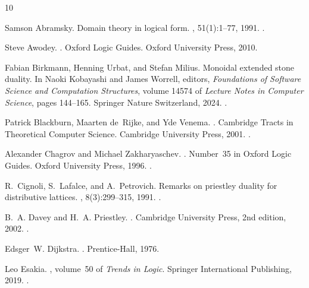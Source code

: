 \documentclass[10pt,a4paper]{article}
\begin{document}
\begin{thebibliography}{10}

Samson Abramsky.
\newblock Domain theory in logical form.
, 51(1):1--77, 1991.
\newblock \href {https://doi.org/10.1016/0168-0072(91)90065-T}
  {}.

Steve Awodey.
.
\newblock Oxford Logic Guides. Oxford University Press, 2010.

Fabian Birkmann, Henning Urbat, and Stefan Milius.
\newblock Monoidal extended stone duality.
\newblock In Naoki Kobayashi and James Worrell, editors, {\em Foundations of
  Software Science and Computation Structures}, volume 14574 of {\em Lecture
  Notes in Computer Science}, pages 144--165. Springer Nature Switzerland,
  2024.
\newblock \href {https://doi.org/10.1007/978-3-031-57228-9_8}
  {}.

Patrick Blackburn, Maarten de~Rijke, and Yde Venema.
.
\newblock Cambridge Tracts in Theoretical Computer Science. Cambridge
  University Press, 2001.
\newblock \href {https://doi.org/10.1017/CBO9781107050884}
  {}.

Alexander Chagrov and Michael Zakharyaschev.
.
\newblock Number~35 in Oxford Logic Guides. Oxford University Press, 1996.
\newblock \href {https://doi.org/10.1093/oso/9780198537793.001.0001}
  {}.

R.~Cignoli, S.~Lafalce, and A.~Petrovich.
\newblock Remarks on priestley duality for distributive lattices.
, 8(3):299--315, 1991.
\newblock \href {https://doi.org/10.1007/BF00383451}
  {}.

B.~A. Davey and H.~A. Priestley.
.
\newblock Cambridge University Press, 2nd edition, 2002.
\newblock \href {https://doi.org/10.1017/CBO9780511809088}
  {}.

Edsger~W. Dijkstra.
.
\newblock Prentice-Hall, 1976.

Leo Esakia.
, volume~50 of {\em Trends in
  Logic}.
\newblock Springer International Publishing, 2019.
\newblock \href {https://doi.org/10.1007/978-3-030-12096-2}
  {}.


\end{thebibliography}
\end{document}

